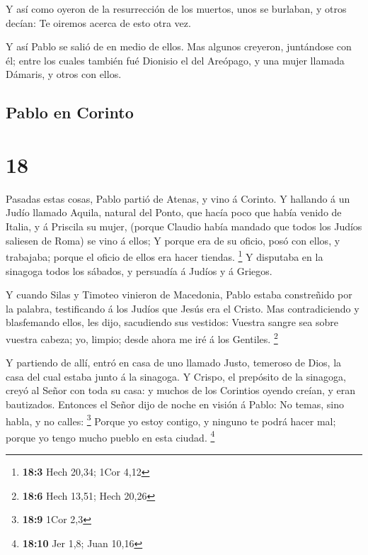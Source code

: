  Y así como oyeron de la resurrección de los muertos,
unos se burlaban, y otros decían: Te oiremos acerca de esto otra vez.

 Y así Pablo se salió de en medio de ellos.
 Mas algunos creyeron, juntándose con él; entre los
cuales también fué Dionisio el del Areópago, y una mujer llamada
Dámaris, y otros con ellos.

\hypertarget{pablo-en-corinto}{%
\subsection{Pablo en Corinto}\label{pablo-en-corinto}}

\hypertarget{section-17}{%
\section{18}\label{section-17}}

 Pasadas estas cosas, Pablo partió de Atenas, y vino á
Corinto.  Y hallando á un Judío llamado Aquila, natural
del Ponto, que hacía poco que había venido de Italia, y á Priscila su
mujer, (porque Claudio había mandado que todos los Judíos saliesen de
Roma) se vino á ellos;  Y porque era de su oficio, posó
con ellos, y trabajaba; porque el oficio de ellos era hacer tiendas.
\footnote{\textbf{18:3} Hech 20,34; 1Cor 4,12}  Y
disputaba en la sinagoga todos los sábados, y persuadía á Judíos y á
Griegos.

 Y cuando Silas y Timoteo vinieron de Macedonia, Pablo
estaba constreñido por la palabra, testificando á los Judíos que Jesús
era el Cristo.  Mas contradiciendo y blasfemando ellos,
les dijo, sacudiendo sus vestidos: Vuestra sangre sea sobre vuestra
cabeza; yo, limpio; desde ahora me iré á los Gentiles. \footnote{\textbf{18:6}
  Hech 13,51; Hech 20,26}

 Y partiendo de allí, entró en casa de uno llamado Justo,
temeroso de Dios, la casa del cual estaba junto á la sinagoga.
 Y Crispo, el prepósito de la sinagoga, creyó al Señor con
toda su casa: y muchos de los Corintios oyendo creían, y eran
bautizados.  Entonces el Señor dijo de noche en visión á
Pablo: No temas, sino habla, y no calles: \footnote{\textbf{18:9} 1Cor
  2,3}  Porque yo estoy contigo, y ninguno te podrá hacer
mal; porque yo tengo mucho pueblo en esta ciudad. \footnote{\textbf{18:10}
  Jer 1,8; Juan 10,16}

